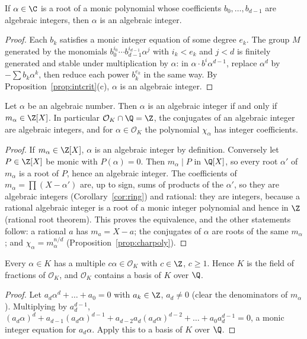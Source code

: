\begin{corollary}\label{cor:transitive}
If $\alpha\in\C$ is a root of a monic polynomial whose coefficients $b_0,\dots,b_{d-1}$ are algebraic integers, then
$\alpha$ is an algebraic integer.
\end{corollary}
\begin{proof}
Each $b_k$ satisfies a monic integer equation of some degree $e_k$. The group $M$ generated by the monomials
$b_0^{i_0}\cdots b_{d-1}^{i_{d-1}}\alpha^j$ with $i_k<e_k$ and $j<d$ is finitely generated and stable under
multiplication by $\alpha$: in $\alpha\cdot b^{i}\alpha^{d-1}$, replace $\alpha^d$ by $-\sum b_k\alpha^k$, then reduce
each power $b_k^{e_k}$ in the same way. By Proposition~\ref{prop:intcrit}(c), $\alpha$ is an algebraic integer.
\end{proof}

\begin{proposition}\label{prop:minpolyZ}
Let $\alpha$ be an algebraic number. Then $\alpha$ is an algebraic integer if and only if $m_\alpha\in\Z[X]$. In
particular $\mathcal O_K\cap\Q=\Z$, the conjugates of an algebraic integer are algebraic integers, and for
$\alpha\in\mathcal O_K$ the polynomial $\chi_\alpha$ has integer coefficients.
\end{proposition}
\begin{proof}
If $m_\alpha\in\Z[X]$, $\alpha$ is an algebraic integer by definition. Conversely let $P\in\Z[X]$ be monic with
$P(\alpha)=0$. Then $m_\alpha\mid P$ in $\Q[X]$, so every root $\alpha'$ of $m_\alpha$ is a root of $P$, hence an
algebraic integer. The coefficients of $m_\alpha=\prod(X-\alpha')$ are, up to sign, sums of products of the $\alpha'$,
so they are algebraic integers (Corollary~\ref{cor:ring}) and rational: they are integers, because a rational
algebraic integer is a root of a monic integer polynomial and hence in $\Z$ (rational root theorem). This proves the
equivalence, and the other statements follow: a rational $a$ has $m_a=X-a$; the conjugates of $\alpha$ are roots of the
same $m_\alpha$; and $\chi_\alpha=m_\alpha^{n/d}$ (Proposition~\ref{prop:charpoly}).
\end{proof}

\begin{proposition}\label{prop:denominators}
Every $\alpha\in K$ has a multiple $c\alpha\in\mathcal O_K$ with $c\in\Z$, $c\ge1$. Hence $K$ is the field of
fractions of $\mathcal O_K$, and $\mathcal O_K$ contains a basis of $K$ over $\Q$.
\end{proposition}
\begin{proof}
Let $a_d\alpha^d+\dots+a_0=0$ with $a_k\in\Z$, $a_d\ne0$ (clear the denominators of $m_\alpha$). Multiplying by
$a_d^{d-1}$, $(a_d\alpha)^d+a_{d-1}(a_d\alpha)^{d-1}+a_{d-2}a_d(a_d\alpha)^{d-2}+\dots+a_0a_d^{d-1}=0$, a monic integer
equation for $a_d\alpha$. Apply this to a basis of $K$ over $\Q$.
\end{proof}

